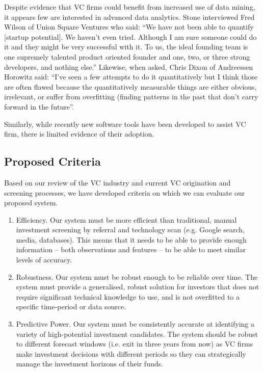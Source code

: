 \documentclass[../thesis/thesis.tex]{subfiles}
\begin{document}
Despite evidence that VC firms could benefit from increased use of data mining, it appears few are interested in advanced data analytics. Stone \cite{stone2014} interviewed Fred Wilson of Union Square Ventures who said: ``We have not been able to quantify [startup potential]. We haven’t even tried. Although I am sure someone could do it and they might be very successful with it. To us, the ideal founding team is one supremely talented product oriented founder and one, two, or three strong developers, and nothing else.'' Likewise, when asked, Chris Dixon of Andreessen Horowitz said: ``I’ve seen a few attempts to do it quantitatively but I think those are often flawed because the quantitatively measurable things are either obvious, irrelevant, or suffer from overfitting (finding patterns in the past that don’t carry forward in the future''.

Similarly, while recently new software tools have been developed to assist VC firm, there is limited evidence of their adoption.

\subsection{Proposed Criteria}

Based on our review of the VC industry and current VC origination and screening processes, we have developed criteria on which we can evaluate our proposed system.

\begin{enumerate}

\item Efficiency. Our system must be more efficient than traditional, manual investment screening by referral and technology scan (e.g. Google search, media, databases). This means that it needs to be able to provide enough information -- both observations and features -- to be able to meet similar levels of accuracy.

\item Robustness. Our system must be robust enough to be reliable over time. The system must provide a generalised, robust solution for investors that does not require significant technical knowledge to use, and is not overfitted to a specific time-period or data source.

\item Predictive Power. Our system must be consistently accurate at identifying a variety of high-potential investment candidates. The system should be robust to different forecast windows (i.e. exit in three years from now) as VC firms make investment decisions with different periods so they can strategically manage the investment horizons of their funds.

\end{enumerate}
\end{document}
